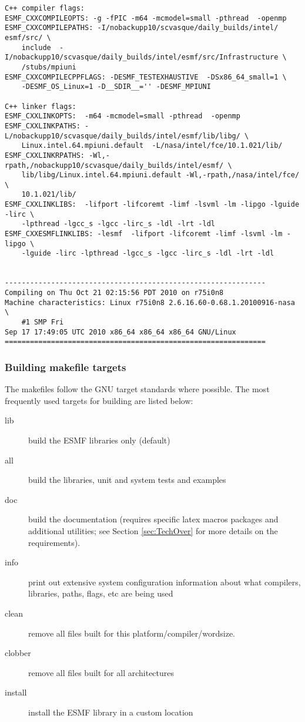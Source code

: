 \begin{verbatim}
C++ compiler flags:
ESMF_CXXCOMPILEOPTS: -g -fPIC -m64 -mcmodel=small -pthread  -openmp
ESMF_CXXCOMPILEPATHS: -I/nobackupp10/scvasque/daily_builds/intel/ esmf/src/ \
	include  -I/nobackupp10/scvasque/daily_builds/intel/esmf/src/Infrastructure \
	/stubs/mpiuni
ESMF_CXXCOMPILECPPFLAGS: -DESMF_TESTEXHAUSTIVE  -DSx86_64_small=1 \
	-DESMF_OS_Linux=1 -D__SDIR__='' -DESMF_MPIUNI

C++ linker flags:
ESMF_CXXLINKOPTS:  -m64 -mcmodel=small -pthread  -openmp
ESMF_CXXLINKPATHS: -L/nobackupp10/scvasque/daily_builds/intel/esmf/lib/libg/ \
	Linux.intel.64.mpiuni.default  -L/nasa/intel/fce/10.1.021/lib/
ESMF_CXXLINKRPATHS: -Wl,-rpath,/nobackupp10/scvasque/daily_builds/intel/esmf/ \
	lib/libg/Linux.intel.64.mpiuni.default -Wl,-rpath,/nasa/intel/fce/ \
	10.1.021/lib/
ESMF_CXXLINKLIBS:  -lifport -lifcoremt -limf -lsvml -lm -lipgo -lguide -lirc \
	-lpthread -lgcc_s -lgcc -lirc_s -ldl -lrt -ldl
ESMF_CXXESMFLINKLIBS: -lesmf  -lifport -lifcoremt -limf -lsvml -lm -lipgo \
	-lguide -lirc -lpthread -lgcc_s -lgcc -lirc_s -ldl -lrt -ldl


--------------------------------------------------------------
Compiling on Thu Oct 21 02:15:56 PDT 2010 on r75i0n8
Machine characteristics: Linux r75i0n8 2.6.16.60-0.68.1.20100916-nasa \
	#1 SMP Fri 
Sep 17 17:49:05 UTC 2010 x86_64 x86_64 x86_64 GNU/Linux
==============================================================

\end{verbatim}


\subsubsection{Building makefile targets}

The makefiles follow the GNU target standards where possible.
The most frequently used targets for building are listed below:
\begin{description}
\item[lib] build the ESMF libraries only (default)
\item[all] build the libraries, unit and system tests and examples
\item[doc] build the documentation (requires specific latex macros packages
and additional utilities; see Section \ref{sec:TechOver} for more details
on the requirements).  
\item[info] print out extensive system configuration information about what
           compilers, libraries, paths, flags, etc are being used
\item[clean] remove all files built for this platform/compiler/wordsize.
\item[clobber] remove all files built for all architectures
\item[install] install the ESMF library in a custom location
\end{description}



